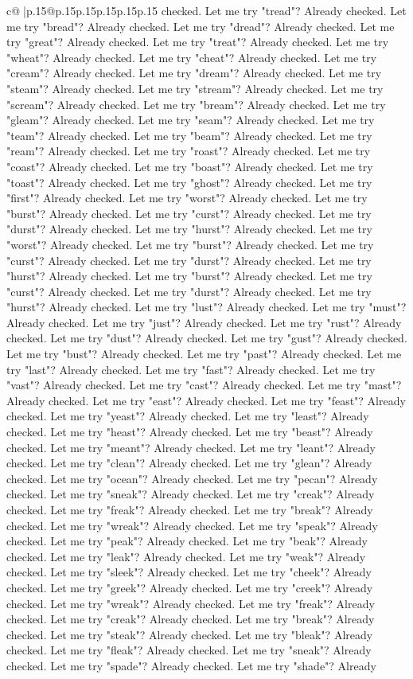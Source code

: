 \documentclass{article}
\begin{document}
{\begin{supertabular}{c@{$\;$}|p{.15\linewidth}@{}p{.15\linewidth}p{.15\linewidth}p{.15\linewidth}p{.15\linewidth}p{.15\linewidth}}
{{{checked. Let me try "tread"? Already checked. Let me try "bread"? Already checked. Let me try "dread"? Already checked. Let me try "great"? Already checked. Let me try "treat"? Already checked. Let me try "wheat"? Already checked. Let me try "cheat"? Already checked. Let me try "cream"? Already checked. Let me try "dream"? Already checked. Let me try "steam"? Already checked. Let me try "stream"? Already checked. Let me try "scream"? Already checked. Let me try "bream"? Already checked. Let me try "gleam"? Already checked. Let me try "seam"? Already checked. Let me try "team"? Already checked. Let me try "beam"? Already checked. Let me try "ream"? Already checked. Let me try "roast"? Already checked. Let me try "coast"? Already checked. Let me try "boast"? Already checked. Let me try "toast"? Already checked. Let me try "ghost"? Already checked. Let me try "first"? Already checked. Let me try "worst"? Already checked. Let me try "burst"? Already checked. Let me try "curst"? Already checked. Let me try "durst"? Already checked. Let me try "hurst"? Already checked. Let me try "worst"? Already checked. Let me try "burst"? Already checked. Let me try "curst"? Already checked. Let me try "durst"? Already checked. Let me try "hurst"? Already checked. Let me try "burst"? Already checked. Let me try "curst"? Already checked. Let me try "durst"? Already checked. Let me try "hurst"? Already checked. Let me try "lust"? Already checked. Let me try "must"? Already checked. Let me try "just"? Already checked. Let me try "rust"? Already checked. Let me try "dust"? Already checked. Let me try "gust"? Already checked. Let me try "bust"? Already checked. Let me try "past"? Already checked. Let me try "last"? Already checked. Let me try "fast"? Already checked. Let me try "vast"? Already checked. Let me try "cast"? Already checked. Let me try "mast"? Already checked. Let me try "east"? Already checked. Let me try "feast"? Already checked. Let me try "yeast"? Already checked. Let me try "least"? Already checked. Let me try "heast"? Already checked. Let me try "beast"? Already checked. Let me try "meant"? Already checked. Let me try "leant"? Already checked. Let me try "clean"? Already checked. Let me try "glean"? Already checked. Let me try "ocean"? Already checked. Let me try "pecan"? Already checked. Let me try "sneak"? Already checked. Let me try "creak"? Already checked. Let me try "freak"? Already checked. Let me try "break"? Already checked. Let me try "wreak"? Already checked. Let me try "speak"? Already checked. Let me try "peak"? Already checked. Let me try "beak"? Already checked. Let me try "leak"? Already checked. Let me try "weak"? Already checked. Let me try "sleek"? Already checked. Let me try "cheek"? Already checked. Let me try "greek"? Already checked. Let me try "creek"? Already checked. Let me try "wreak"? Already checked. Let me try "freak"? Already checked. Let me try "creak"? Already checked. Let me try "break"? Already checked. Let me try "steak"? Already checked. Let me try "bleak"? Already checked. Let me try "fleak"? Already checked. Let me try "sneak"? Already checked. Let me try "spade"? Already checked. Let me try "shade"? Already }}}
\end{supertabular}}
\end{document}
